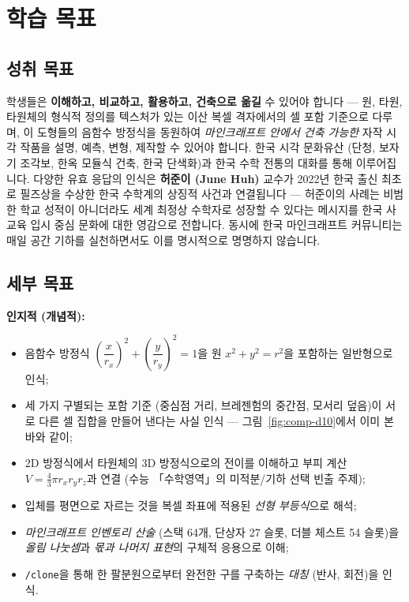 \documentclass[12pt,a4paper]{scrartcl}
\newcommand{\acc}[1]{\textcolor{accent}{\textbf{#1}}}
\newcommand{\cmd}[1]{\textcolor{earth}{\texttt{\small #1}}}
\begin{document}
\section{학습 목표}\label{sec:objetivos}

\subsection{성취 목표}

학생들은 \acc{이해하고, 비교하고, 활용하고, 건축으로 옮길} 수 있어야 합니다 --- 원, 타원, 타원체의 형식적 정의를 텍스처가 있는 이산 복셀 격자에서의 셀 포함 기준으로 다루며, 이 도형들의 음함수 방정식을 동원하여 \emph{마인크래프트 안에서 건축 가능한} 자작 시각 작품을 설명, 예측, 변형, 제작할 수 있어야 합니다. 한국 시각 문화유산 (단청, 보자기 조각보, 한옥 모듈식 건축, 한국 단색화)과 한국 수학 전통의 대화를 통해 이루어집니다. 다양한 유효 응답의 인식은 \acc{허준이 (June Huh)} 교수가 2022년 한국 출신 최초로 필즈상을 수상한 한국 수학계의 상징적 사건과 연결됩니다 --- 허준이의 사례는 비범한 학교 성적이 아니더라도 세계 최정상 수학자로 성장할 수 있다는 메시지를 한국 사교육 입시 중심 문화에 대한 영감으로 전합니다. 동시에 한국 마인크래프트 커뮤니티는 매일 공간 기하를 실천하면서도 이를 명시적으로 명명하지 않습니다.

\subsection{세부 목표}

\textbf{인지적 (개념적):}
\begin{itemize}[leftmargin=1.3em,itemsep=0.2em,topsep=0.3em]
  \item 음함수 방정식 $\left(\dfrac{x}{r_x}\right)^{\!2} + \left(\dfrac{y}{r_y}\right)^{\!2} = 1$을 원 $x^2 + y^2 = r^2$을 포함하는 일반형으로 인식;
  \item 세 가지 구별되는 포함 기준 (중심점 거리, 브레젠험의 중간점, 모서리 덮음)이 서로 다른 셀 집합을 만들어 낸다는 사실 인식 --- 그림~\ref{fig:comp-d10}에서 이미 본 바와 같이;
  \item 2D 방정식에서 타원체의 3D 방정식으로의 전이를 이해하고 부피 계산 $V = \tfrac{4}{3}\pi r_x r_y r_z$과 연결 (수능 「수학영역」의 미적분/기하 선택 빈출 주제);
  \item 입체를 평면으로 자르는 것을 복셀 좌표에 적용된 \emph{선형 부등식}으로 해석;
  \item \emph{마인크래프트 인벤토리 산술} (스택 64개, 단상자 27 슬롯, 더블 체스트 54 슬롯)을 \emph{올림 나눗셈}과 \emph{몫과 나머지 표현}의 구체적 응용으로 이해;
  \item \cmd{/clone}을 통해 한 팔분원으로부터 완전한 구를 구축하는 \emph{대칭} (반사, 회전)을 인식.
\end{itemize}
\end{document}
